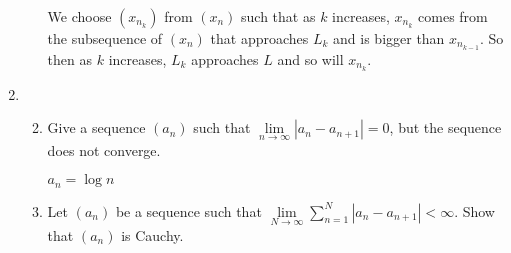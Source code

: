 \documentclass[letterpaper]{article}
\begin{document}
\begin{enumerate}
\begin{enumerate}
  We choose $(x_{n_k})$ from $(x_n)$ such that as $k$ increases, $x_{n_k}$ comes from the subsequence of $(x_n)$ that approaches $L_k$ and is bigger than $x_{n_{k-1}}$. So then as $k$ increases, $L_k$ approaches $L$ and so will $x_{n_k}$.
  \end{enumerate}
\item
  \begin{enumerate}
  \setcounter{enumii}{1}
  \item
  Give a sequence $(a_n)$ such that $\lim\limits_{n\to\infty}\left\lvert a_n-a_{n+1}\right\rvert=0$, but the sequence does not converge.

  $a_n=\log n$
  \item
  Let $(a_n)$ be a sequence such that $\lim\limits_{N\to\infty}{\sum_{n=1}^N{\left\lvert a_n-a_{n+1}\right\rvert}}<\infty$.
  Show that $(a_n)$ is Cauchy.


\end{enumerate}
\end{enumerate}
\end{document}
